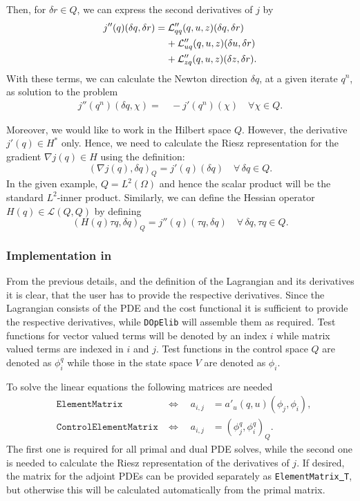 {Then, for $\delta r\in Q$, we can express the second derivatives of $j$ by
\begin{align*}
j''(q)(\delta q, \delta r) 
&= {\cal L}_{qq}'' (q,u,z)(\delta q,\delta r) \\
&\;\;\;\;+ {\cal L}_{uq}'' (q,u,z)(\delta u,\delta r) \\ 
&\;\;\;\;+ {\cal L}_{zq}'' (q,u,z)(\delta z,\delta r).
\end{align*}
With these terms, we can calculate the Newton direction $\delta q$, at a given 
iterate $q^n$, as solution to the problem
\begin{align*}
j''(q^n )(\delta q,\chi ) =&\, -j'(q^n)(\chi) \quad\forall\chi \in Q.
\end{align*}

Moreover, we would like to work in the Hilbert space $Q$. However, the derivative 
$j'(q) \in H^*$ only. Hence, we need to calculate the Riesz representation 
for the gradient $\nabla j(q) \in H$ using the definition:
\[
 (\nabla j(q),\delta q)_Q = j'(q)(\delta q) \quad \forall\,\delta q\in Q.
\]
In the given example, $Q = L^2(\Omega)$ and hence the scalar product will be the
standard $L^2$-inner product. Similarly, we can define the Hessian operator 
$H(q) \in \mathcal L(Q,Q)$ by defining
\[
 (H(q)\tau q,\delta q)_Q = j''(q)(\tau q,\delta q) \quad \forall\,\delta q,\tau q\in Q.
\]
}

\subsubsection{Implementation in \dope{}}
From the previous details, and the definition of the Lagrangian and its 
derivatives it is clear, that the user has to provide the respective derivatives. 
Since the Lagrangian consists of the PDE and the cost functional it 
is sufficient to provide the respective derivatives, while \texttt{DOpElib} 
will assemble them as required.
Test functions for vector valued terms will be denoted by an index $i$ while 
matrix valued terms are indexed in $i$ and $j$. Test functions in the control 
space $Q$ are denoted as $\phi^q_i$ while those in the state space $V$ are denoted 
as $\phi_i$.

To solve the linear equations the following matrices are needed
\begin{align*}
&\texttt{ElementMatrix} 
&\Leftrightarrow \quad a_{i,j} &= a'_u(q,u)(\phi_j,\phi_i), \\
&\texttt{ControlElementMatrix}  
&\Leftrightarrow \quad a_{i,j} &= (\phi^q_j, \phi^q_i)_Q.
\end{align*}
The first one is required for all primal and dual PDE solves, while the second one is needed 
to calculate the Riesz representation of the derivatives of $j$. 
If desired, the matrix for the adjoint PDEs can be provided separately as 
\texttt{ElementMatrix\underline{ }T}, but otherwise this will be 
calculated automatically from the primal matrix.

